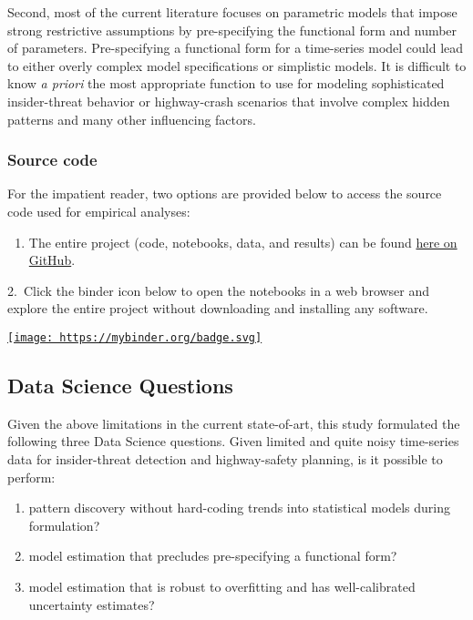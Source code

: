 \documentclass[11pt]{article}
\makeatletter
\def\maxwidth{\ifdim\Gin@nat@width>\linewidth\linewidth
    \else\Gin@nat@width\fi}
\let\Oldincludegraphics\includegraphics
\renewcommand{\includegraphics}[1]{\Oldincludegraphics[width=.8\maxwidth]{#1}}
\providecommand{\tightlist}{%
      \setlength{\itemsep}{0pt}\setlength{\parskip}{0pt}}
\makeatother
\begin{document}
Second, most of the current literature focuses on parametric models that
impose strong restrictive assumptions by pre-specifying the functional
form and number of parameters. Pre-specifying a functional form for a
time-series model could lead to either overly complex model
specifications or simplistic models. It is difficult to know \emph{a
priori} the most appropriate function to use for modeling sophisticated
insider-threat behavior or highway-crash scenarios that involve complex
hidden patterns and many other influencing factors.

\subsubsection{Source code}\label{source-code}

For the impatient reader, two options are provided below to access the
source code used for empirical analyses:

\begin{enumerate}
\def\labelenumi{\arabic{enumi}.}
\tightlist
\item
  The entire project (code, notebooks, data, and results) can be found
  \href{https://github.com/Emaasit/long-range-extrapolation}{here on
  GitHub}.
\end{enumerate}

2.~Click the binder icon below to open the notebooks in a web browser
and explore the entire project without downloading and installing any
software.

\href{https://mybinder.org/v2/gh/Emaasit/long-range-extrapolation/master?urlpath=lab}{\texttt{[image: https://mybinder.org/badge.svg]}}

\subsection{Data Science Questions}\label{data-science-questions}

Given the above limitations in the current state-of-art, this study
formulated the following three Data Science questions. Given limited and
quite noisy time-series data for insider-threat detection and
highway-safety planning, is it possible to perform:

\begin{enumerate}
\def\labelenumi{\arabic{enumi}.}
\item
  pattern discovery without hard-coding trends into statistical models
  during formulation?
\item
  model estimation that precludes pre-specifying a functional form?
\item
  model estimation that is robust to overfitting and has well-calibrated
  uncertainty estimates?
\end{enumerate}
\end{document}
